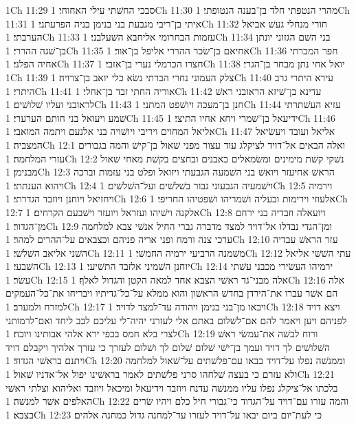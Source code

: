1Ch 11:29  סבכי החשׁתי עילי האחוחי׃
1Ch 11:30  מהרי הנטפתי חלד בן־בענה הנטופתי׃
1Ch 11:31  איתי בן־ריבי מגבעת בני בנימן בניה הפרעתני׃
1Ch 11:32  חורי מנחלי געשׁ אביאל הערבתי׃
1Ch 11:33  עזמות הבחרומי אליחבא השׁעלבני׃
1Ch 11:34  בני השׁם הגזוני יונתן בן־שׁגה ההררי׃
1Ch 11:35  אחיאם בן־שׂכר ההררי אליפל בן־אור׃
1Ch 11:36  חפר המכרתי אחיה הפלני׃
1Ch 11:37  חצרו הכרמלי נערי בן־אזבי׃
1Ch 11:38  יואל אחי נתן מבחר בן־הגרי׃
1Ch 11:39  צלק העמוני נחרי הברתי נשׂא כלי יואב בן־צרויה׃
1Ch 11:40  עירא היתרי גרב היתרי׃
1Ch 11:41  אוריה החתי זבד בן־אחלי׃
1Ch 11:42  עדינא בן־שׁיזא הראובני ראשׁ לראובני ועליו שׁלושׁים׃
1Ch 11:43  חנן בן־מעכה ויושׁפט המתני׃
1Ch 11:44  עזיא העשׁתרתי שׁמע ויעואל בני חותם הערערי׃
1Ch 11:45  ידיעאל בן־שׁמרי ויחא אחיו התיצי׃
1Ch 11:46  אליאל המחוים ויריבי ויושׁויה בני אלנעם ויתמה המואבי׃
1Ch 11:47  אליאל ועובד ויעשׂיאל המצביה׃
1Ch 12:1  ואלה הבאים אל־דויד לציקלג עוד עצור מפני שׁאול בן־קישׁ והמה בגבורים עזרי המלחמה׃
1Ch 12:2  נשׁקי קשׁת מימינים ומשׂמאלים באבנים ובחצים בקשׁת מאחי שׁאול מבנימן׃
1Ch 12:3  הראשׁ אחיעזר ויואשׁ בני השׁמעה הגבעתי ויזואל ופלט בני עזמות וברכה ויהוא הענתתי׃
1Ch 12:4  וישׁמעיה הגבעוני גבור בשׁלשׁים ועל־השׁלשׁים׃
1Ch 12:5  וירמיה ויחזיאל ויוחנן ויוזבד הגדרתי׃
1Ch 12:6  אלעוזי וירימות ובעליה ושׁמריהו ושׁפטיהו החריפי׃
1Ch 12:7  אלקנה וישׁיהו ועזראל ויועזר וישׁבעם הקרחים׃
1Ch 12:8  ויועאלה וזבדיה בני ירחם מן־הגדור׃
1Ch 12:9  ומן־הגדי נבדלו אל־דויד למצד מדברה גברי החיל אנשׁי צבא למלחמה ערכי צנה ורמח ופני אריה פניהם וכצבאים על־ההרים למהר׃
1Ch 12:10  עזר הראשׁ עבדיה השׁני אליאב השׁלשׁי׃
1Ch 12:11  משׁמנה הרביעי ירמיה החמשׁי׃
1Ch 12:12  עתי השׁשׁי אליאל השׁבעי׃
1Ch 12:13  יוחנן השׁמיני אלזבד התשׁיעי׃
1Ch 12:14  ירמיהו העשׂירי מכבני עשׁתי עשׂר׃
1Ch 12:15  אלה מבני־גד ראשׁי הצבא אחד למאה הקטן והגדול לאלף׃
1Ch 12:16  אלה הם אשׁר עברו את־הירדן בחדשׁ הראשׁון והוא ממלא על־כל־גדיתיו ויבריחו את־כל־העמקים למזרח ולמערב׃
1Ch 12:17  ויבאו מן־בני בנימן ויהודה עד־למצד לדויד׃
1Ch 12:18  ויצא דויד לפניהם ויען ויאמר להם אם־לשׁלום באתם אלי לעזרני יהיה־לי עליכם לבב ליחד ואם־לרמותני לצרי בלא חמס בכפי ירא אלהי אבותינו ויוכח׃
1Ch 12:19  ורוח לבשׁה את־עמשׂי ראשׁ השׁלושׁים לך דויד ועמך בן־ישׁי שׁלום שׁלום לך ושׁלום לעזרך כי עזרך אלהיך ויקבלם דויד ויתנם בראשׁי הגדוד׃
1Ch 12:20  וממנשׁה נפלו על־דויד בבאו עם־פלשׁתים על־שׁאול למלחמה ולא עזרם כי בעצה שׁלחהו סרני פלשׁתים לאמר בראשׁינו יפול אל־אדניו שׁאול׃
1Ch 12:21  בלכתו אל־ציקלג נפלו עליו ממנשׁה עדנח ויוזבד וידיעאל ומיכאל ויוזבד ואליהוא וצלתי ראשׁי האלפים אשׁר למנשׁה׃
1Ch 12:22  והמה עזרו עם־דויד על־הגדוד כי־גבורי חיל כלם ויהיו שׂרים בצבא׃
1Ch 12:23  כי לעת־יום ביום יבאו על־דויד לעזרו עד־למחנה גדול כמחנה אלהים׃
